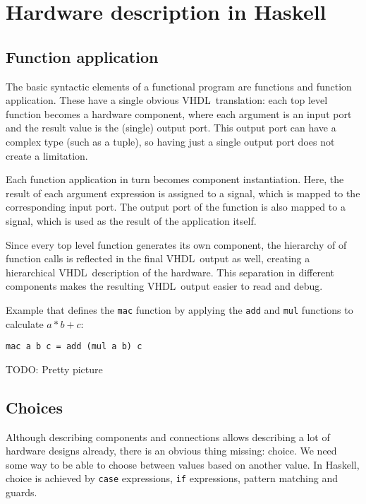 \documentclass[conference]{IEEEtran}
\def\VHDL{\textsc{VHDL}}
\def\hs#1{\texttt{#1}}
\begin{document}
\section{Hardware description in Haskell}

  \subsection{Function application}
    The basic syntactic elements of a functional program are functions
    and function application. These have a single obvious \VHDL\
    translation: each top level function becomes a hardware component,
    where each argument is an input port and the result value is the
    (single) output port. This output port can have a complex type (such
    as a tuple), so having just a single output port does not create a
    limitation.

    Each function application in turn becomes component instantiation.
    Here, the result of each argument expression is assigned to a
    signal, which is mapped to the corresponding input port. The output
    port of the function is also mapped to a signal, which is used as
    the result of the application itself.

    Since every top level function generates its own component, the
    hierarchy of of function calls is reflected in the final \VHDL\
    output as well, creating a hierarchical \VHDL\ description of the
    hardware.  This separation in different components makes the
    resulting \VHDL\ output easier to read and debug.

    Example that defines the \texttt{mac} function by applying the
    \texttt{add} and \texttt{mul} functions to calculate $a * b + c$:

\begin{verbatim}
mac a b c = add (mul a b) c
\end{verbatim}

    TODO: Pretty picture

  \subsection{Choices }
    Although describing components and connections allows describing a
    lot of hardware designs already, there is an obvious thing missing:
    choice. We need some way to be able to choose between values based
    on another value.  In Haskell, choice is achieved by \hs{case}
    expressions, \hs{if} expressions, pattern matching and guards.
\end{document}
